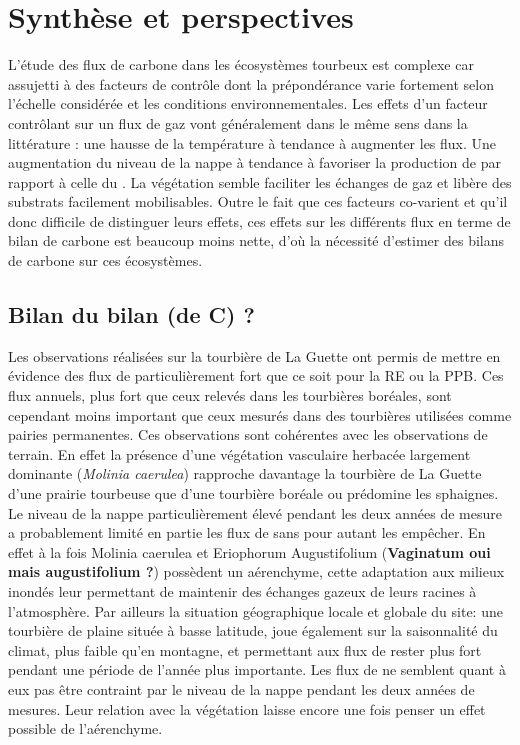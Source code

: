 \chapter*{Synthèse et perspectives}
\newpage

L'étude des flux de carbone dans les écosystèmes tourbeux est complexe car assujetti à des facteurs de contrôle dont la prépondérance varie fortement selon l'échelle considérée et les conditions environnementales.
Les effets d'un facteur contrôlant sur un flux de gaz vont généralement dans le même sens dans la littérature : 
une hausse de la température à tendance à augmenter les flux.
Une augmentation du niveau de la nappe à tendance à favoriser la production de \chh par rapport à celle du \coo.
La végétation semble faciliter les échanges de gaz et libère des substrats facilement mobilisables.
Outre le fait que ces facteurs co-varient et qu'il donc difficile de distinguer leurs effets, ces effets sur les différents flux en terme de bilan de carbone est beaucoup moins nette, d'où la nécessité d'estimer des bilans de carbone sur ces écosystèmes.

\section*{Bilan du bilan (de C) ?}





Les observations réalisées sur la tourbière de La Guette ont permis de mettre en évidence des flux de \coo particulièrement fort que ce soit pour la RE ou la PPB.
Ces flux annuels, plus fort que ceux relevés dans les tourbières boréales, sont cependant moins important que ceux mesurés dans des tourbières utilisées comme pairies permanentes.
Ces observations sont cohérentes avec les observations de terrain.
En effet la présence d'une végétation vasculaire herbacée largement dominante (\textit{Molinia caerulea}) rapproche davantage la tourbière de La Guette d'une prairie tourbeuse que d'une tourbière boréale ou prédomine les sphaignes.
Le niveau de la nappe particulièrement élevé pendant les deux années de mesure a probablement limité en partie les flux de \coo sans pour autant les empêcher.
En effet à la fois Molinia caerulea et Eriophorum Augustifolium (\textbf{Vaginatum oui mais augustifolium ?}) possèdent un aérenchyme, cette adaptation aux milieux inondés leur permettant de maintenir des échanges gazeux de leurs racines à l'atmosphère.
Par ailleurs la situation géographique locale et globale du site: une tourbière de plaine située à basse latitude, joue également sur la saisonnalité du climat, plus faible qu'en montagne, et permettant aux flux de rester plus fort pendant une période de l'année plus importante.
Les flux de \chh ne semblent quant à eux pas être contraint par le niveau de la nappe pendant les deux années de mesures.
Leur relation avec la végétation laisse encore une fois penser un effet possible de l'aérenchyme.

